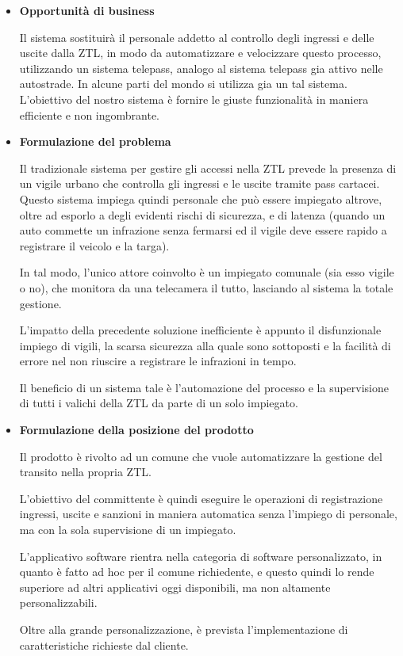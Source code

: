 \documentclass[12pt, letterpaper]{article}
\begin{document}
\begin{itemize}
    \item \textbf{Opportunità di business}
    
    Il sistema sostituirà il personale addetto al controllo degli ingressi e delle uscite dalla ZTL, in modo da automatizzare e velocizzare questo processo, utilizzando un sistema telepass, analogo al sistema telepass gia attivo nelle autostrade. In alcune parti del mondo si utilizza gia un tal sistema. L'obiettivo del nostro sistema è fornire le giuste funzionalità in maniera efficiente e non ingombrante.

    \item \textbf{Formulazione del problema}
    
    Il tradizionale sistema per gestire gli accessi nella ZTL prevede la presenza di un vigile urbano che controlla gli ingressi e le uscite tramite pass cartacei. Questo sistema impiega quindi personale che può essere impiegato altrove, oltre ad esporlo a degli evidenti rischi di sicurezza, e di latenza (quando un auto commette un infrazione senza fermarsi ed il vigile deve essere rapido a registrare il veicolo e la targa).

    In tal modo, l'unico attore coinvolto è un impiegato comunale (sia esso vigile o no), che monitora da una telecamera il tutto, lasciando al sistema la totale gestione.

    L'impatto della precedente soluzione inefficiente è appunto il disfunzionale impiego di vigili, la scarsa sicurezza alla quale sono sottoposti e la facilità di errore nel non riuscire a registrare le infrazioni in tempo.

    Il beneficio di un sistema tale è l'automazione del processo e la supervisione di tutti i valichi della ZTL da parte di un solo impiegato.
    
    \item \textbf{Formulazione della posizione del prodotto}
    
    Il prodotto è rivolto ad un comune che vuole automatizzare la gestione del transito nella propria ZTL.

    L'obiettivo del committente è quindi eseguire le operazioni di registrazione ingressi, uscite e sanzioni in maniera automatica senza l'impiego di personale, ma con la sola supervisione di un impiegato.

    L'applicativo software rientra nella categoria di software personalizzato, in quanto è fatto ad hoc per il comune richiedente, e questo quindi lo rende superiore ad altri applicativi oggi disponibili, ma non altamente personalizzabili.

    Oltre alla grande personalizzazione, è prevista l'implementazione di caratteristiche richieste dal cliente.

\end{itemize}
\end{document}
